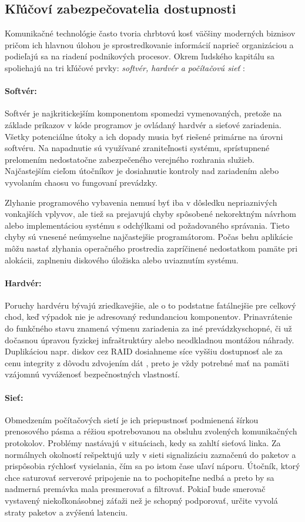 \documentclass[12pt, a4paper]{article}
\begin{document}
\subsection{Kľúčoví zabezpečovatelia dostupnosti}
Komunikačné technológie často tvoria chrbtovú kosť väčšiny moderných biznisov pričom ich hlavnou úlohou je 
sprostredkovanie informácií naprieč organizáciou a podieľajú sa na riadení podnikových procesov. Okrem 
ľudského kapitálu sa spoliehajú na tri kľúčové prvky: \emph{softvér, hardvér a počítačovú sieť} 
\cite{availability}:

\paragraph{Softvér:}
Softvér je najkritickejším komponentom spomedzi vymenovaných, pretože na základe príkazov v kóde programov 
je ovládaný hardvér a sieťové zariadenia. Všetky potenciálne útoky a ich dopady musia byť riešené primárne 
na úrovni softvéru. Na napadnutie sú využívané zraniteľnosti systému, sprístupnené prelomením nedostatočne 
zabezpečeného verejného rozhrania služieb. Najčastejším cieľom útočníkov je dosiahnutie kontroly nad 
zariadením alebo vyvolaním chaosu vo fungovaní prevádzky. 
 
Zlyhanie programového vybavenia nemusí byť iba v dôsledku nepriaznivých vonkajších vplyvov, ale tiež sa 
prejavujú chyby spôsobené nekorektným návrhom alebo implementáciou systému s odchýlkami od
požadovaného správania. Tieto chyby sú  vnesené neúmyselne najčastejšie programátorom. Počas behu aplikácie 
môžu nastať zlyhania operačného prostredia zapríčinené nedostatkom pamäte pri alokácii, zaplneniu diskového 
úložiska alebo uviaznutím systému. 

\paragraph{Hardvér:}
Poruchy hardvéru bývajú zriedkavejšie, ale o to podstatne fatálnejšie pre celkový chod, keď
výpadok nie je adresovaný redundanciou komponentov. Prinavrátenie do funkčného stavu znamená výmenu
zariadenia za iné prevádzkyschopné, či už dočasnou úpravou fyzickej infraštruktúry alebo neodkladnou 
montážou náhrady. Duplikáciou napr. diskov cez RAID dosiahneme síce vyššiu dostupnosť ale za cenu integrity 
z dôvodu zdvojením dát \cite{availability}, preto je vždy potrebné mať na pamäti vzájomnú vyváženosť 
bezpečnostných vlastností.

\paragraph{Sieť:}
Obmedzením počítačových sietí je ich priepustnosť podmienená šírkou prenosového pásma a réžiou 
spotrebovanou na obsluhu zvolených komunikačných protokolov. Problémy nastávajú v situáciach, kedy sa 
zahltí sieťová linka. Za normálnych okolností rešpektujú uzly v sieti signalizáciu zaznačenú do 
paketov a prispôsobia rýchlosť vysielania, čím sa po istom čase uľaví náporu. Útočník, ktorý chce saturovať 
serverové pripojenie na to pochopiteľne nedbá a preto by sa nadmerná premávka mala presmerovať a 
filtrovať. Pokiaľ bude smerovač vystavený niekoľkonásobnej záťaži než je schopný podporovať, určite vyvolá 
straty paketov a zvýšenú latenciu.
\end{document}
